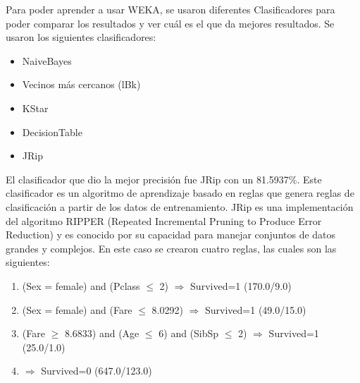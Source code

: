 \documentclass[letterpaper,11pt,spanish]{report}
\begin{document}
\newpage



\cleardoublepage
\pagestyle{mainstyle} %
\setcounter{page}{1} %

%

\cleardoublepage
Para poder aprender a usar WEKA, se usaron diferentes Clasificadores para poder comparar los resultados y ver cu\'al es el que da mejores resultados. Se usaron los siguientes clasificadores:
\begin{itemize}
    \item NaiveBayes
    \item Vecinos m\'as cercanos (lBk)
    \item KStar
    \item DecisionTable
    \item JRip
\end{itemize}

El clasificador que dio la mejor precisi\'on fue JRip con un 81.5937\%. Este clasificador es un algoritmo de aprendizaje basado en reglas que genera reglas de clasificación a partir de los datos de entrenamiento. JRip es una implementación del algoritmo RIPPER (Repeated Incremental Pruning to Produce Error Reduction) y es conocido por su capacidad para manejar conjuntos de datos grandes y complejos. En este caso se crearon cuatro reglas, las cuales son las siguientes:
\begin{enumerate}
  \item (Sex = female) and (Pclass $\leq$ 2) $\Rightarrow$ Survived=1 (170.0/9.0)
  \item (Sex = female) and (Fare $\leq$ 8.0292) $\Rightarrow$ Survived=1 (49.0/15.0)
  \item (Fare $\geq$ 8.6833) and (Age $\leq$ 6) and (SibSp $\leq$ 2) $\Rightarrow$ Survived=1 (25.0/1.0)
  \item $\Rightarrow$ Survived=0 (647.0/123.0)
\end{enumerate}
\end{document}
